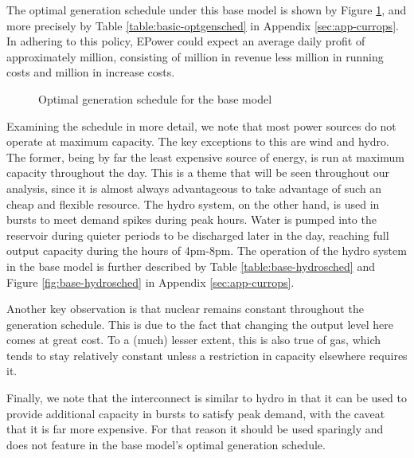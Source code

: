 \documentclass[twocolumn]{article}
\begin{document}
    The optimal generation schedule under this base model is shown by Figure \ref{fig:base-optgensched}, and more precisely by Table \ref{table:basic-optgensched} in Appendix \ref{sec:app-currops}.  In adhering to this policy, EPower could expect an average daily profit of approximately  million, consisting of  million in revenue less  million in running costs and  million in increase costs.
    
    \begin{figure}[ht!]
        \centering
        \caption{Optimal generation schedule for the base model\label{fig:base-optgensched}}
    \end{figure}
    
    Examining the schedule in more detail, we note that most power sources do not operate at maximum capacity.  The key exceptions to this are wind and hydro.  The former, being by far the least expensive source of energy, is run at maximum capacity throughout the day.  This is a theme that will be seen throughout our analysis, since it is almost always advantageous to take advantage of such an cheap and flexible resource.  The hydro system, on the other hand, is used in bursts to meet demand spikes during peak hours.  Water is pumped into the reservoir during quieter periods to be discharged later in the day, reaching full output capacity during the hours of 4pm-8pm. The operation of the hydro system in the base model is further described by Table \ref{table:base-hydrosched} and Figure \ref{fig:base-hydrosched} in Appendix \ref{sec:app-currops}.
    
	Another key observation is that nuclear remains constant throughout the generation schedule.  This is due to the fact that changing the output level here comes at great cost.  To a (much) lesser extent, this is also true of gas, which tends to stay relatively constant unless a restriction in capacity elsewhere requires it.
        
	Finally, we note that the interconnect is similar to hydro in that it can be used to provide additional capacity in bursts to satisfy peak demand, with the caveat that it is far more expensive.  For that reason it should be used sparingly and does not feature in the base model's optimal generation schedule.
    
\end{document}
